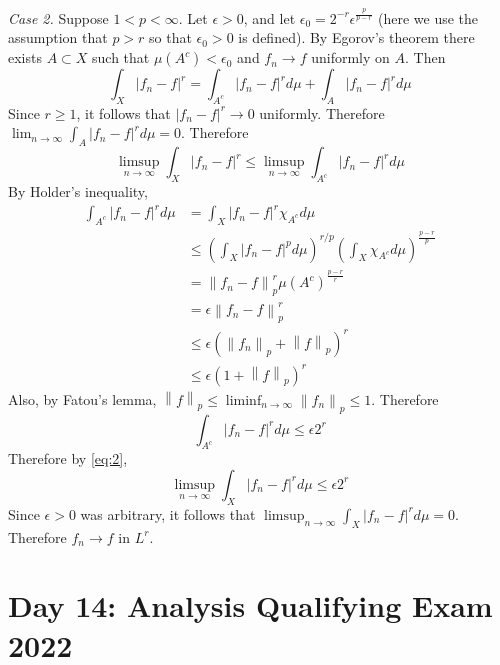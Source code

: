 \documentclass{exam}
\theoremstyle{problemstyle}
\newcommand{\norm}[1]{\left\lVert#1\right\rVert} %
\newcommand{\1}[1]{\textbf{1}_{\left[#1\right]}} %
\begin{document}
\begin{questions}
\begin{solution}
  \textit{Case 2.} Suppose $1<p<\infty$. Let $\epsilon>0$, and let $\epsilon_{0} = 2^{-r} \epsilon^{\frac{p}{p-r}}$ (here we use the assumption that $p>r$ so that $\epsilon_{0}>0$ is defined). By Egorov's theorem there exists $A\subset X$ such that $\mu(A^{c})<\epsilon_{0}$ and $f_{n}\to f$ uniformly on $A$. Then
  \begin{equation*}
    \int_{X} |f_{n}-f|^{r} = \int_{A^{c}}|f_{n}-f|^{r}d\mu + \int_{A}|f_{n}-f|^{r}d\mu
  \end{equation*}
  Since $r\geq 1$, it follows that $|f_{n}-f|^{r}\to 0$ uniformly. Therefore $\lim_{n\to\infty }\int_{A}|f_{n}-f|^{r}d\mu =0$. Therefore
  \begin{equation}\label{eq:2}
    \limsup_{n\to\infty} \int_{X} |f_{n}-f|^{r} \leq \limsup_{n\to\infty} \int_{A^{c}}|f_{n}-f|^{r}d\mu
  \end{equation}
  By Holder's inequality,
  \begin{align*}
    \int_{A^{c}}|f_{n}-f|^{r}d\mu
    &= \int_{X} |f_{n}-f|^{r}\chi_{A^{c}} d\mu\\
    &\leq \left( \int_{X}|f_{n}-f|^{p} d\mu\right)^{r/p}\left( \int_{X}\chi_{A^{c}}d\mu  \right)^{\frac{p-r}{p}}\\
    &= \norm{f_{n}-f}_{p}^{r}\mu(A^{c})^{\frac{p-r}{r}}\\
    &= \epsilon\norm{f_{n}-f}_{p}^{r}\\
    &\leq \epsilon ( \norm{f_{n}}_{p}+ \norm{f}_{p})^{r}\\
    &\leq \epsilon \left( 1 + \norm{f}_{p} \right)^{r}
  \end{align*}
  Also, by Fatou's lemma, $\norm{f}_{p}\leq \liminf_{n\to\infty} \norm{f_{n}}_{p}\leq 1$. Therefore
  \begin{equation*}
    \int_{A^{c}} | f_{n}-f|^{r}d\mu \leq \epsilon 2^{r}
  \end{equation*}
  Therefore by \eqref{eq:2},
  \begin{equation*}
     \limsup_{n\to\infty} \int_{X} |f_{n}-f|^{r}d\mu  \leq \epsilon 2^{r}
   \end{equation*}
   Since $\epsilon>0$ was arbitrary, it follows that $\limsup_{n\to\infty} \int_{X} |f_{n}-f|^{r}d\mu=0$. Therefore $f_{n}\to f$ in $L^{r}$.
\end{solution}




\newpage
\section{Day 14: Analysis Qualifying Exam 2022}


\end{questions}
\end{document}
